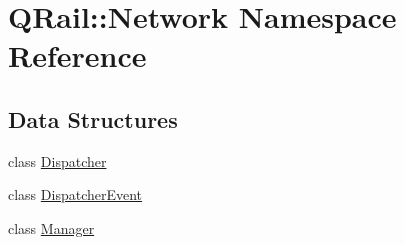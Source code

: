 \hypertarget{namespaceQRail_1_1Network}{}\section{Q\+Rail\+::Network Namespace Reference}
\label{namespaceQRail_1_1Network}
\subsection*{Data Structures}
\begin{DoxyCompactItemize}
\item 
class \mbox{\hyperlink{classQRail_1_1Network_1_1Dispatcher}{Dispatcher}}
\item 
class \mbox{\hyperlink{classQRail_1_1Network_1_1DispatcherEvent}{Dispatcher\+Event}}
\item 
class \mbox{\hyperlink{classQRail_1_1Network_1_1Manager}{Manager}}
\end{DoxyCompactItemize}

